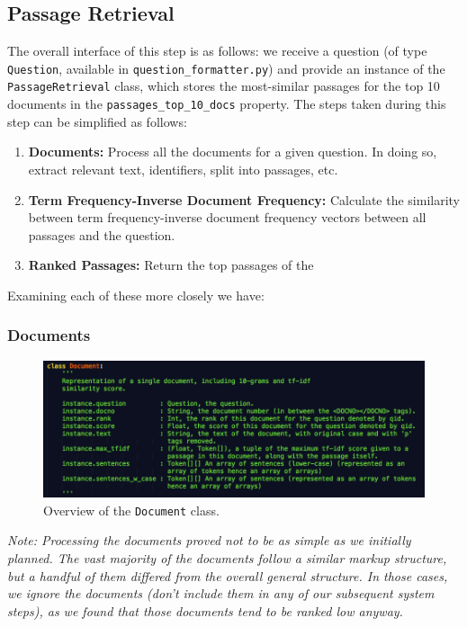 \documentclass{article}
\begin{document}
\subsection{Passage Retrieval}
The overall interface of this step is as follows: we receive a question (of type \texttt{Question}, available in \texttt{question\_formatter.py}) and provide an instance of the \texttt{PassageRetrieval} class, which stores the most-similar passages for the top 10 documents in the \texttt{passages\_top\_10\_docs} property.
The steps taken during this step can be simplified as follows:
\begin{enumerate}
\item \textbf{Documents:} Process all the documents for a given question. In doing so, extract relevant text, identifiers, split into passages, etc.
\item \textbf{Term Frequency-Inverse Document Frequency:} Calculate the similarity between term frequency-inverse document frequency vectors between all passages and the question.
\item \textbf{Ranked Passages: }Return the top passages of the 
\end{enumerate}

Examining each of these more closely we have:\\
\subsubsection{Documents}
\begin{figure}[h]
    \centering
    \includegraphics[width=1.0\textwidth]{images/document.png}
    \caption{Overview of the \texttt{Document} class.}
\end{figure}
\textit{Note: Processing the documents proved not to be as simple as we initially planned. The vast majority of the documents follow a similar markup structure, but a handful of them differed from the overall general structure. In those cases, we ignore the documents (don't include them in any of our subsequent system steps), as we found that those documents tend to be ranked low anyway.}\\
\end{document}
